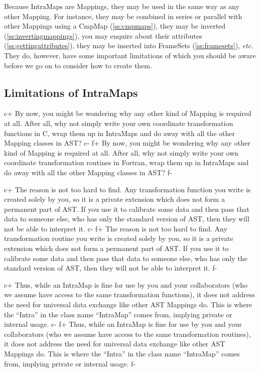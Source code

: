 \documentclass[twoside,11pt]{article}
\newcommand{\secref}[1]{\S\ref{#1}}
\renewcommand{\secref}[1]{\ref{#1}}
\begin{document}
Because IntraMaps are Mappings, they may be used in the same way as
any other Mapping. For instance, they may be combined in series or
parallel with other Mappings using a CmpMap (\secref{ss:cmpmaps}),
they may be inverted (\secref{ss:invertingmappings}), you may enquire
about their attributes (\secref{ss:gettingattributes}), they may be
inserted into FrameSets (\secref{ss:framesets}), {\em{etc.}} They do,
however, have some important limitations of which you should be aware
before we go on to consider how to create them.

\subsection{\label{ss:intramaplimitations}Limitations of IntraMaps}

c+
By now, you might be wondering why any other kind of Mapping is
required at all. After all, why not simply write your own coordinate
transformation functions in C, wrap them up in IntraMaps and do away
with all the other Mapping classes in AST?
c-
f+
By now, you might be wondering why any other kind of Mapping is
required at all. After all, why not simply write your own coordinate
transformation routines in Fortran, wrap them up in IntraMaps and do
away with all the other Mapping classes in AST?
f-

c+
The reason is not too hard to find. Any transformation function you
write is created solely by you, so it is a private extension which
does not form a permanent part of AST. If you use it to calibrate some
data and then pass that data to someone else, who has only the
standard version of AST, then they will not be able to interpret it.
c-
f+
The reason is not too hard to find. Any transformation routine you
write is created solely by you, so it is a private extension which
does not form a permanent part of AST. If you use it to calibrate some
data and then pass that data to someone else, who has only the
standard version of AST, then they will not be able to interpret it.
f-

c+
Thus, while an IntraMap is fine for use by you and your collaborators
(who we assume have access to the same transformation functions), it
does not address the need for universal data exchange like other AST
Mappings do. This is where the ``Intra'' in the class name
``IntraMap'' comes from, implying private or internal usage.
c-
f+
Thus, while an IntraMap is fine for use by you and your collaborators
(who we assume have access to the same transformation routines), it
does not address the need for universal data exchange like other AST
Mappings do. This is where the ``Intra'' in the class name
``IntraMap'' comes from, implying private or internal usage.
f-
\end{document}
